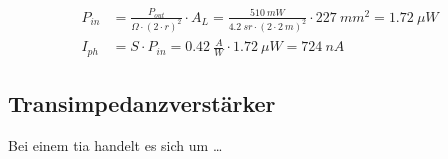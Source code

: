 \begin{equation}\label{eq:photocurrent_scenario2}
    \begin{split}
        P_{in} &= \frac{P_{out}}{\Omega \cdot (2 \cdot r)^2} \cdot A_{L} = \frac{510~mW}{4.2~sr \cdot (2 \cdot 2~m)^2} \cdot 227~mm^2 = 1.72~\mu W\\
        I_{ph} &= S \cdot P_{in} = 0.42~\frac{A}{W} \cdot 1.72~\mu W = 724~nA
    \end{split}
\end{equation}
\myequations{}

\pagebreak

\subsection{Transimpedanzverstärker}

Bei einem \acrfull{tia} handelt es sich um \dots
